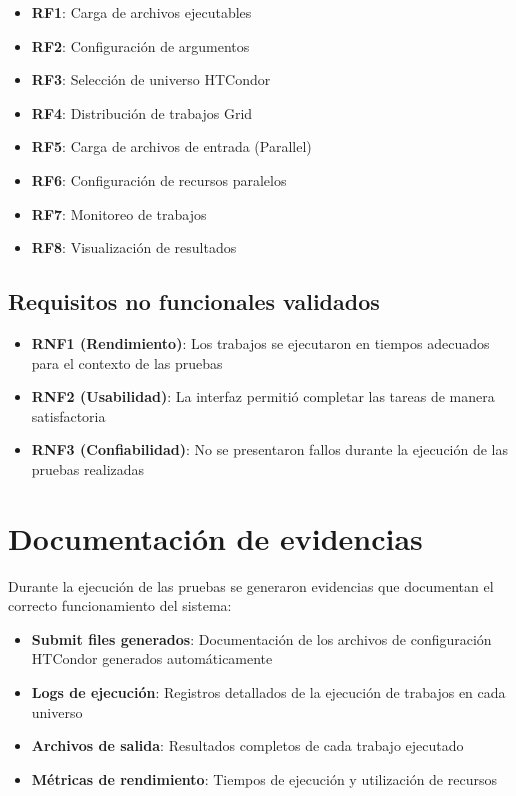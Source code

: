 \begin{itemize}
	\item \textbf{RF1}: Carga de archivos ejecutables
	\item \textbf{RF2}: Configuración de argumentos  
	\item \textbf{RF3}: Selección de universo HTCondor
	\item \textbf{RF4}: Distribución de trabajos Grid
	\item \textbf{RF5}: Carga de archivos de entrada (Parallel)
	\item \textbf{RF6}: Configuración de recursos paralelos
	\item \textbf{RF7}: Monitoreo de trabajos
	\item \textbf{RF8}: Visualización de resultados
\end{itemize}

\subsection{Requisitos no funcionales validados}
\noindent

\begin{itemize}
	\item \textbf{RNF1 (Rendimiento)}: Los trabajos se ejecutaron en tiempos adecuados para el contexto de las pruebas
	\item \textbf{RNF2 (Usabilidad)}: La interfaz permitió completar las tareas de manera satisfactoria
	\item \textbf{RNF3 (Confiabilidad)}: No se presentaron fallos durante la ejecución de las pruebas realizadas
\end{itemize}

\section{Documentación de evidencias}
\noindent

Durante la ejecución de las pruebas se generaron evidencias que documentan el correcto funcionamiento del sistema:

\begin{itemize}
	\item \textbf{Submit files generados}: Documentación de los archivos de configuración HTCondor generados automáticamente
	\item \textbf{Logs de ejecución}: Registros detallados de la ejecución de trabajos en cada universo
	\item \textbf{Archivos de salida}: Resultados completos de cada trabajo ejecutado
	\item \textbf{Métricas de rendimiento}: Tiempos de ejecución y utilización de recursos
\end{itemize}


